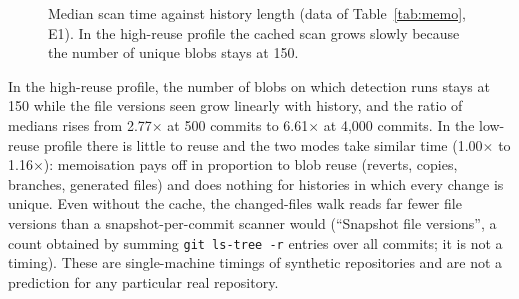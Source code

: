 \documentclass[conference]{IEEEtran}
\newcommand{\code}[1]{\texttt{#1}}
\begin{document}
\begin{figure}[t]
\centering
{}
\caption{Median scan time against history length (data of Table~\ref{tab:memo}, E1). In the
high-reuse profile the cached scan grows slowly because the number of unique blobs stays at 150.}
\label{fig:memo}
\end{figure}

In the high-reuse profile, the number of blobs on which detection runs stays at 150 while the file
versions seen grow linearly with history, and the ratio of medians rises from 2.77$\times$ at 500
commits to 6.61$\times$ at 4{,}000 commits. In the low-reuse profile there is little to reuse and
the two modes take similar time (1.00$\times$ to 1.16$\times$): memoisation pays off in
proportion to blob reuse (reverts, copies, branches, generated files) and does nothing for
histories in which every change is unique. Even without the cache, the changed-files walk reads
far fewer file versions than a snapshot-per-commit scanner would (``Snapshot file versions'', a
count obtained by summing \code{git ls-tree -r} entries over all commits; it is not a timing).
These are single-machine timings of synthetic repositories and are not a prediction for any
particular real repository.
\end{document}
